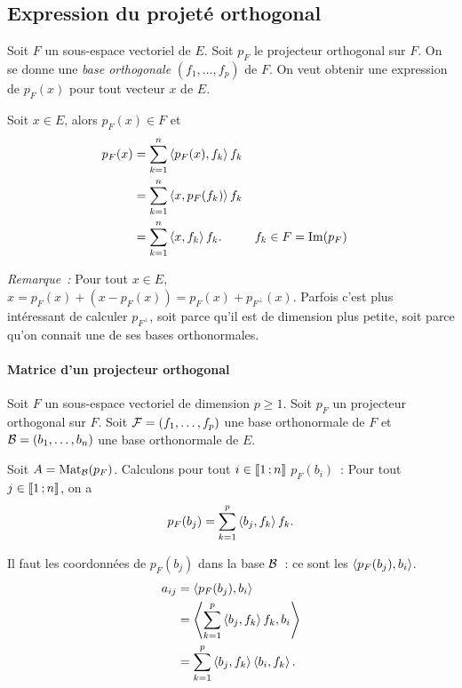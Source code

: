 \subsection{Expression du projeté orthogonal}

Soit \(F\) un sous-espace vectoriel de \(E\). Soit \(p_F\) le projecteur 
orthogonal sur \(F\). On se donne une \emph{base orthogonale} \((f_1, \ldots, 
f_p)\) de \(F\). On veut obtenir une expression de \(p_F(x)\) pour tout 
vecteur \(x\) de \(E\).

Soit \(x \in E\), alors \(p_F(x) \in F\) et
\begin{align*}
  p_F(x) &=\sum_{k=1}^n \left\langle{p_F(x)},{f_k}\right\rangle f_k \\
  &=\sum_{k=1}^n \left\langle{x},{p_F(f_k)}\right\rangle f_k \\
  &=\sum_{k=1}^n \left\langle{x},{f_k}\right\rangle f_k. && f_k \in F=\operatorname{Im}(p_F)
\end{align*}

\emph{Remarque~:} Pour tout \(x \in E\), \(x = p_F(x) +(x-p_F(x)) = p_F(x) + 
p_{F^\perp}(x)\). Parfois c'est plus intéressant de calculer \(p_{F^\perp}\), 
soit parce qu'il est de dimension plus petite, soit parce qu'on connait une de 
ses bases orthonormales.

\paragraph{Matrice d'un projecteur orthogonal}
Soit \(F\) un sous-espace vectoriel de dimension \(p \geqslant 1\). Soit 
\(p_F\) un projecteur orthogonal sur \(F\). Soit \(\mathcal{F}=(f_1, \ldots, f_p)\) une 
base orthonormale de \(F\) et \(\mathcal{B}=(b_1, \ldots, b_n)\) une base orthonormale 
de \(E\).

Soit \(A=\mathrm{Mat}_{\mathcal{B}}(p_F)\). Calculons pour tout \(i \in \mathopen{\llbracket}1\mathclose{}\mathpunct{};n\mathclose{\rrbracket}\) 
\(p_F(b_i)\)~: Pour tout \(j \in \mathopen{\llbracket}1\mathclose{}\mathpunct{};n\mathclose{\rrbracket}\), on a
\begin{equation}
  p_F(b_j)=\sum_{k=1}^p \left\langle{b_j},{f_k}\right\rangle f_k.
\end{equation}

Il faut les coordonnées de \(p_F(b_j)\) dans la base \(\mathcal{B}\)~: ce sont les 
\(\left\langle{p_F(b_j)},{b_i}\right\rangle\).
\begin{align*}
  a_{ij} &= \left\langle{p_F(b_j)},{b_i}\right\rangle \\
  &= \left\langle{\sum_{k=1}^p \left\langle{b_j},{f_k}\right\rangle f_k},{b_i}\right\rangle \\
  &= \sum_{k=1}^p \left\langle{b_j},{f_k}\right\rangle \left\langle{b_i},{f_k}\right\rangle.
\end{align*}

